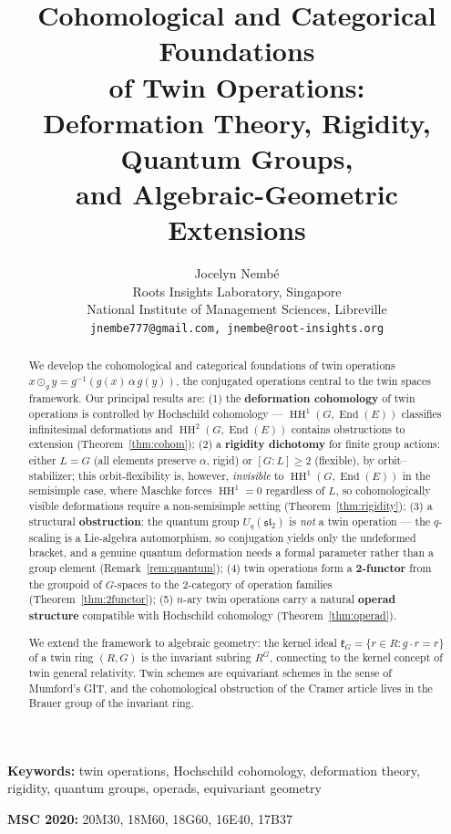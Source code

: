 \documentclass[11pt,twocolumn]{article}
\title{\textbf{Cohomological and Categorical Foundations\\of Twin Operations:\\Deformation Theory, Rigidity, Quantum Groups,\\and Algebraic-Geometric Extensions}}
\author{Jocelyn Nemb\'e\\
\small Roots Insights Laboratory, Singapore\\
\small National Institute of Management Sciences, Libreville\\
\small \texttt{jnembe777@gmail.com, jnembe@root-insights.org}}
\date{}
\theoremstyle{plain}\newtheorem{theorem}{Theorem}\newtheorem{proposition}[theorem]{Proposition}\newtheorem{corollary}[theorem]{Corollary}\newtheorem{lemma}[theorem]{Lemma}
\theoremstyle{definition}\newtheorem{definition}[theorem]{Definition}\newtheorem{example}[theorem]{Example}
\theoremstyle{remark}\newtheorem{remark}[theorem]{Remark}
\newcommand{\HH}{\operatorname{HH}}
\newcommand{\End}{\operatorname{End}}
\begin{document}
\maketitle

\begin{abstract}
We develop the cohomological and categorical foundations of twin operations $x \odot_g y = g^{-1}(g(x) \,\alpha\, g(y))$, the conjugated operations central to the twin spaces framework. Our principal results are:
(1) the \textbf{deformation cohomology} of twin operations is controlled by Hochschild cohomology --- $\HH^1(G, \End(E))$ classifies infinitesimal deformations and $\HH^2(G, \End(E))$ contains obstructions to extension (Theorem~\ref{thm:cohom});
(2) a \textbf{rigidity dichotomy} for finite group actions: either $L = G$ (all elements preserve $\alpha$, rigid) or $[G:L] \geq 2$ (flexible), by orbit--stabilizer; this orbit-flexibility is, however, \emph{invisible} to $\HH^1(G, \End(E))$ in the semisimple case, where Maschke forces $\HH^1 = 0$ regardless of $L$, so cohomologically visible deformations require a non-semisimple setting (Theorem~\ref{thm:rigidity});
(3) a structural \textbf{obstruction}: the quantum group $U_q(\mathfrak{sl}_2)$ is \emph{not} a twin operation --- the $q$-scaling is a Lie-algebra automorphism, so conjugation yields only the undeformed bracket, and a genuine quantum deformation needs a formal parameter rather than a group element (Remark~\ref{rem:quantum});
(4) twin operations form a \textbf{2-functor} from the groupoid of $G$-spaces to the 2-category of operation families (Theorem~\ref{thm:2functor});
(5) $n$-ary twin operations carry a natural \textbf{operad structure} compatible with Hochschild cohomology (Theorem~\ref{thm:operad}).

We extend the framework to algebraic geometry: the kernel ideal $\mathfrak{k}_G = \{r \in R : g \cdot r = r\}$ of a twin ring $(R, G)$ is the invariant subring $R^G$, connecting to the kernel concept of twin general relativity. Twin schemes are equivariant schemes in the sense of Mumford's GIT, and the cohomological obstruction of the Cramer article lives in the Brauer group of the invariant ring.
\end{abstract}

\noindent\textbf{Keywords:} twin operations, Hochschild cohomology, deformation theory, rigidity, quantum groups, operads, equivariant geometry

\noindent\textbf{MSC 2020:} 20M30, 18M60, 18G60, 16E40, 17B37
\end{document}
